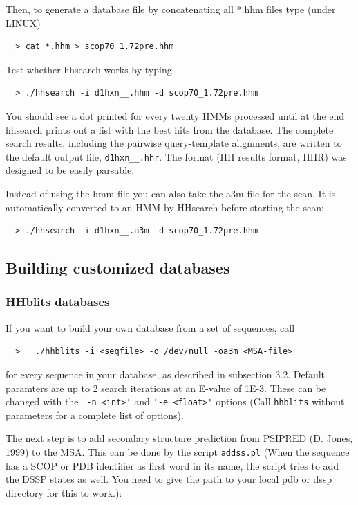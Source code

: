 \documentclass[11pt,a4paper]{article}
\begin{document}
Then, to generate a database file by concatenating all *.hhm files type (under LINUX)
\begin{verbatim}
  > cat *.hhm > scop70_1.72pre.hhm
\end{verbatim}

Test whether hhsearch works by typing
\begin{verbatim}
  > ./hhsearch -i d1hxn__.hhm -d scop70_1.72pre.hhm
\end{verbatim}

You should see a dot printed for every twenty HMMs processed until at the end 
hhsearch prints out a list with the best hits from the database. The complete 
search results, including the pairwise query-template alignments, are written to the 
default output file, \verb`d1hxn__.hhr`. The format (HH results format, HHR) was 
designed to be easily parsable.

Instead of using the hmm file you can also take the a3m file for the scan. It is 
automatically converted to an HMM by HHsearch before starting the scan:
\begin{verbatim}
  > ./hhsearch -i d1hxn__.a3m -d scop70_1.72pre.hhm
\end{verbatim}



\subsection{Building customized databases}

\subsubsection{HHblits databases}

If you want to build your own database from a set of sequences, call 
\begin{verbatim}
  >   ./hhblits -i <seqfile> -o /dev/null -oa3m <MSA-file>
\end{verbatim}

for every sequence in your database, as described in subsection 3.2. Default paramters 
are up to 2 search iterations at an E-value of 1E-3. These can be changed with the 
\verb`'-n <int>'` and \verb`'-e <float>'` options (Call \verb`hhblits` without parameters for a 
complete list of options). 

The next step is to add secondary structure prediction from PSIPRED (D. Jones, 1999) to the
MSA. This can be done by the script \verb`addss.pl` (When the sequence has a SCOP or PDB identifier as first word 
in its name, the script tries to add the DSSP states as well. You need to give the 
path to your local pdb or dssp directory for this to work.):
\end{document}
